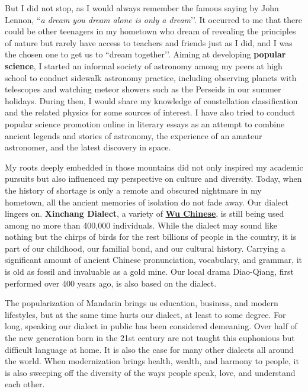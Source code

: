 \documentclass[11pt, a4paper]{awesome-cv} %
\begin{document}
\begin{cvletter}
But I did not stop, as I would always remember the famous saying by John Lennon, ``\textit{a dream you dream alone is only a dream}’’. It occurred to me that there could be other teenagers in my hometown who dream of revealing the principles of nature but rarely have access to teachers and friends just as I did, and I was the chosen one to get us to ``dream together’’. Aiming at developing \textbf{popular science}, I started an informal society of astronomy among my peers at high school to conduct sidewalk astronomy practice, including observing planets with telescopes and watching meteor showers such as the Perseids in our summer holidays. During then, I would share my knowledge of constellation classification and the related physics for some sources of interest. I have also tried to conduct popular science promotion online in literary essays as an attempt to combine ancient legends and stories of astronomy, the experience of an amateur astronomer, and the latest discovery in space.


My roots deeply embedded in those mountains did not only inspired my academic pursuits but also influenced my perspective on culture and diversity. Today, when the history of shortage is only a remote and obscured nightmare in my hometown, all the ancient memories of isolation do not fade away. Our dialect lingers on. \textbf{Xinchang Dialect}, a variety of \href{https://en.wikipedia.org/wiki/Wu_Chinese}{\textbf{Wu Chinese}}, is still being used among no more than 400,000 individuals. While the dialect may sound like nothing but the chirps of birds for the rest billions of people in the country, it is part of our childhood, our familial bond, and our cultural history. Carrying a significant amount of ancient Chinese pronunciation, vocabulary, and grammar, it is old as fossil and invaluable as a gold mine. Our local drama Diao-Qiang, first performed over 400 years ago, is also based on the dialect. 

The popularization of Mandarin brings us education, business, and modern lifestyles, but at the same time hurts our dialect, at least to some degree. For long, speaking our dialect in public has been considered demeaning. Over half of the new generation born in the 21st century are not taught this euphonious but difficult language at home. It is also the case for many other dialects all around the world. When modernization brings health, wealth, and harmony to people, it is also sweeping off the diversity of the ways people speak, love, and understand each other.


\end{cvletter}
\end{document}
